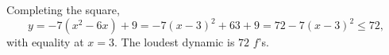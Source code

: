 Completing the square,
\[y=-7\left(x^2-6x\right)+9=-7(x-3)^2+63+9=72-7(x-3)^2\le72,\]
with equality at $x=3$. The loudest dynamic is $\boxed{72}$ $f$'s.
